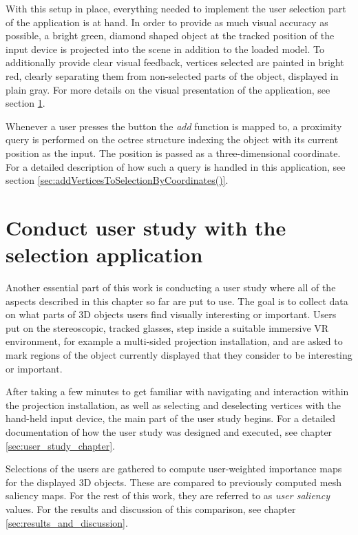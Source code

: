 With this setup in place, everything needed to implement the user selection part of the application is at hand. In order to provide as much visual accuracy as possible, a bright green, diamond shaped object at the tracked position of the input device is projected into the scene in addition to the loaded model. To additionally provide clear visual feedback, vertices selected are painted in bright red, clearly separating them from non-selected parts of the object, displayed in plain gray. For more details on the visual presentation of the application, see section \ref{sec:conduct_user_study_with_the_selection_application}.

Whenever a user presses the button the \textit{add} function is mapped to, a proximity query is performed on the octree structure indexing the object with its current position as the input. The position is passed as a three-dimensional coordinate. For a detailed description of how such a query is handled in this application, see section \ref{sec:addVerticesToSelectionByCoordinates()}.

	\section {Conduct user study with the selection application}
	\label{sec:conduct_user_study_with_the_selection_application}
Another essential part of this work is conducting a user study where all of the aspects described in this chapter so far are put to use. The goal is to collect data on what parts of 3D objects users find visually interesting or important. Users put on the stereoscopic, tracked glasses, step inside a suitable immersive VR environment, for example a multi-sided projection installation, and are asked to mark regions of the object currently displayed that they consider to be interesting or important.

After taking a few minutes to get familiar with navigating and interaction within the projection installation, as well as selecting and deselecting vertices with the hand-held input device, the main part of the user study begins. For a detailed documentation of how the user study was designed and executed, see chapter \ref{sec:user_study_chapter}.

Selections of the users are gathered to compute user-weighted importance maps for the displayed 3D objects. These are compared to previously computed mesh saliency maps. For the rest of this work, they are referred to as \textit{user saliency} values. For the results and discussion of this comparison, see chapter \ref{sec:results_and_discussion}.

